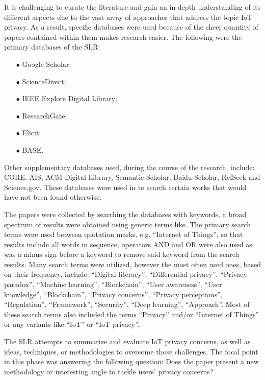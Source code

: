 It is challenging to curate the literature and
gain an in-depth understanding of its different aspects due to the vast
array of approaches that address the topic IoT privacy. As a result, specific
databases were used because of the sheer quantity of papers contained within
them makes research easier. The following were the primary databases of the SLR:

\begin{itemize}
    \item[$\bullet$]
    Google Scholar;
    \item[$\bullet$]
    ScienceDirect;
    \item[$\bullet$]
    IEEE Explore Digital Library;
    \item[$\bullet$]
    ResearchGate;
    \item[$\bullet$]
    Elicit;
    \item[$\bullet$]
    BASE.
\end{itemize}

Other supplementary databases used, during the course of the research, include:
CORE, AIS, ACM Digital Library, Semantic Scholar, Baidu Scholar, RefSeek and
Science.gov. These databases were used in to search certain works that
would have not been found otherwise.

The papers were collected by searching the databases with keywords, a broad
spectrum of results were obtained using generic terms like. The primary search
terms were used between quotation marks, e.g. ``Internet of Things'', so that
results include all words in sequence, operators AND and OR were also used
as was a minus sign before a keyword to remove said keyword from the search
results. Many search terms were utilized, however the most often
used ones, based on their frequency, include: ``Digital literacy'',
``Differential privacy'', ``Privacy paradox'', ``Machine learning'',
``Blockchain'', ``User awareness'', ``User knowledge'', ``Blockchain'',
``Privacy concerns'', ``Privacy perceptions'', ``Regulation'',
``Framework'', ``Security'', ``Deep learning'', ``Approach''.
Most of these search terms also included the terms ``Privacy'' and/or
``Internet of Things'' or any variants like ``IoT'' or ``IoT privacy''.

The SLR attempts to summarize and evaluate IoT privacy concerns, as well
as ideas, techniques, or methodologies to overcome those challenges.
The focal point in this phase was answering the following question: Does
the paper present a new methodology or interesting angle to tackle users'
privacy concerns?

